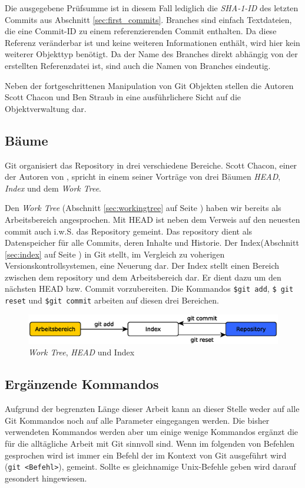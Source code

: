 Die ausgegebene Prüfsumme ist in diesem Fall lediglich die \textit{SHA-1-ID} des
letzten Commits aus Abschnitt \ref{sec:first_commits}. Branches sind einfach
Textdateien, die eine Commit-ID zu einem referenzierenden Commit enthalten. Da
diese Referenz veränderbar ist und keine weiteren Informationen enthält, wird
hier kein weiterer Objekttyp benötigt. Da der Name des Branches direkt abhängig
von der erstellten Referenzdatei ist, sind auch die Namen von Branches
eindeutig.

Neben der fortgeschrittenen Manipulation von Git Objekten stellen die Autoren
Scott Chacon und Ben Straub in \cite[S.~408-418]{progit} eine ausführlichere
Sicht auf die Objektverwaltung dar.

\subsection{Bäume}\label{sec:trees}
Git organisiert das Repository in drei verschiedene Bereiche. Scott Chacon,
einer der Autoren von \cite{progit}, spricht in einem seiner
Vorträge\cite{link:talesoftrees} von drei Bäumen \textit{HEAD}, \textit{Index}
und dem \textit{Work Tree}.

Den \textit{Work Tree} (Abschnitt \ref{sec:workingtree} auf Seite
\pageref{sec:workingtree}) haben wir bereits als Arbeitsbereich angesprochen.
Mit \gls{HEAD} ist neben dem Verweis auf den neuesten commit auch i.w.S. das
Repository gemeint. Das \gls{repository} dient als Datenspeicher für alle
Commits, deren Inhalte und Historie. Der Index(Abschnitt \ref{sec:index} auf
Seite \pageref{sec:index}) in Git stellt, im Vergleich zu voherigen
Versionskontrollsystemen, eine Neuerung dar. Der Index stellt einen Bereich
zwischen dem \gls{repository} und dem Arbeitsbereich dar. Er dient dazu um den
nächsten \gls{HEAD} bzw. Commit vorzubereiten. Die Kommandos \texttt{\$git
add}, \texttt{\$ git reset} und \texttt{\$git commit} arbeiten auf diesen drei
Bereichen.\cite[34-35]{gitosp}

\begin{figure}[h]
    \centering
    \includegraphics[scale=0.60]{images/trees.eps}
    \caption{\textit{Work Tree}, \textit{HEAD} und Index\cite[34]{gitosp}}
    \label{fig:trees}
\end{figure}

\subsection{Ergänzende Kommandos}\label{sec:commands}
Aufgrund der begrenzten Länge dieser Arbeit kann an dieser Stelle weder auf
alle Git Kommandos noch auf alle Parameter eingegangen werden. Die bisher
verwendeten Kommandos werden aber um einige wenige Kommandos ergänzt die für
die alltägliche Arbeit mit Git sinnvoll sind. Wenn im folgenden von Befehlen
gesprochen wird ist immer ein Befehl der im Kontext von Git ausgeführt wird
(\texttt{git <Befehl>}), gemeint. Sollte es gleichnamige Unix-Befehle geben
wird darauf gesondert hingewiesen.

